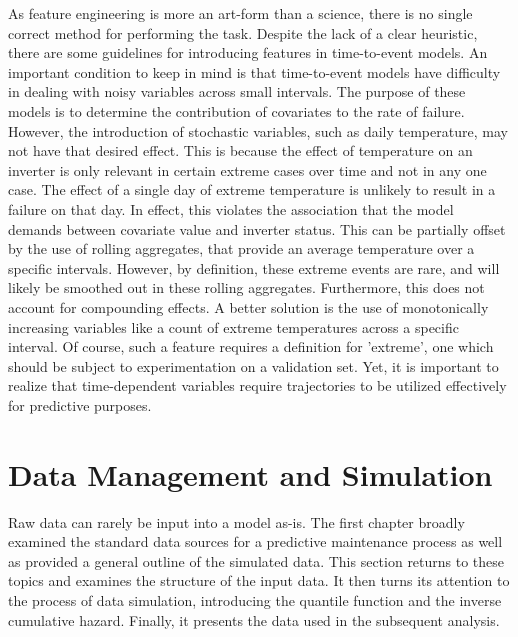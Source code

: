 As feature engineering is more an art-form than a science, there is no single correct method for performing the task. Despite the lack of a clear heuristic, there are some guidelines for introducing features in time-to-event models. An important condition to keep in mind is that time-to-event models have difficulty in dealing with noisy variables across small intervals. The purpose of these models is to determine the contribution of covariates to the rate of failure. However, the introduction of stochastic variables, such as daily temperature, may not have that desired effect. This is because the effect of temperature on an inverter is only relevant in certain extreme cases over time and not in any one case. The effect of a single day of extreme temperature is unlikely to result in a failure on that day. In effect, this violates the association that the model demands between covariate value and inverter status. This can be partially offset by the use of rolling aggregates, that provide an average temperature over a specific intervals. However, by definition, these extreme events are rare, and will likely be smoothed out in these rolling aggregates. Furthermore, this does not account for compounding effects. A better solution is the use of monotonically increasing variables like a count of extreme temperatures across a specific interval. Of course, such a feature requires a definition for 'extreme', one which should be subject to experimentation on a validation set. Yet, it is important to realize that time-dependent variables require trajectories to be utilized effectively for predictive purposes. 






\section*{Data Management and Simulation}


Raw data can rarely be input into a model as-is. The first chapter broadly examined the standard data sources for a predictive maintenance process as well as provided a general outline of the simulated data. This section returns to these topics and examines the structure of the input data. It then turns its attention to the process of data simulation, introducing the quantile function and the inverse cumulative hazard. Finally, it presents the data used in the subsequent analysis.


